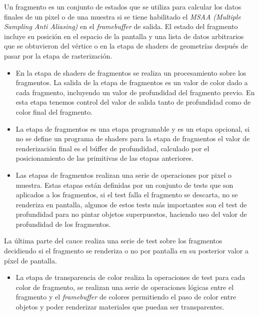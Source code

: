 \documentclass[a4paper]{book}
\begin{document}
Un fragmento es un conjunto de estados que se utiliza para calcular los datos finales de un pixel o de una muestra si se tiene
habilitado el \textit{MSAA (Multiple Sampling Anti Aliasing)} en el \textit{framebuffer} de salida. El estado del fragmento incluye su posición
en el espacio de la pantalla y una lista de datos arbitrarios que se obtuvieron del vértice o en la etapa de shaders de geometrías
después de pasar por la etapa de rasterización.

\begin{itemize}
  \item En la etapa de shaders de fragmentos se realiza un procesamiento sobre los fragmentos. La salida de la etapa de fragmentos es
  un valor de color dado a cada fragmento, incluyendo un valor de profundidad del fragmento previo. En esta etapa tenemos control
  del valor de salida tanto de profundidad como de color final del fragmento.

  \item La etapa de fragmentos es una etapa programable y es un etapa opcional, si no se define un programa de shaders para la etapa
  de fragmentos el valor de renderización final es el búffer de profundidad, calculado por el posicionamiento de las primitivas de
  las etapas anteriores.

  \item Las etapas de fragmentos realizan una serie de operaciones por pixel o muestra. Estas etapas están definidas por un conjunto
  de tests que son aplicados a los fragmentos, si el test falla el fragmento se descarta, no se renderiza en pantalla, algunos de
  estos tests más importantes son el test de profundidad para no pintar objetos superpuestos, haciendo uso del valor de profundidad
  de los fragmentos.
\end{itemize}

La última parte del cauce realiza una serie de test sobre los fragmentos decidiendo si el fragmento se renderiza o no por pantalla en
su posterior valor a píxel de pantalla.

\begin{itemize}
  \item  La etapa de transparencia de color realiza la operaciones de test para cada color de fragmento, se realizan una serie de
  operaciones lógicas entre el fragmento y el \textit{framebuffer} de colores permitiendo el paso de color entre objetos y poder renderizar
  materiales que puedan ser transparentes.
\end{itemize}
\end{document}
